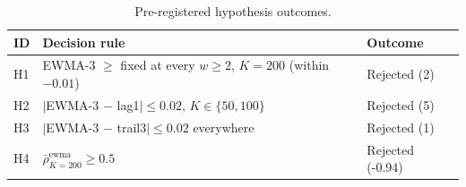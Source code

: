 \begin{table}[!t]
  \caption{Pre-registered hypothesis outcomes.}
  \label{tab:hypotheses}
  \centering
  \small
  \setlength{\tabcolsep}{4pt}
  \begin{tabular}{@{}p{0.5cm}p{5.0cm}p{1.8cm}@{}}
    \toprule
    \textbf{ID} & \textbf{Decision rule} & \textbf{Outcome} \\
    \midrule
    H1 & EWMA-3 $\geq$ fixed at every $w\geq 2$, $K=200$ (within $-0.01$) & Rejected (2) \\
    H2 & $|$EWMA-3 $-$ lag1$|\leq 0.02$, $K\in\{50,100\}$ & Rejected (5) \\
    H3 & $|$EWMA-3 $-$ trail3$|\leq 0.02$ everywhere & Rejected (1) \\
    H4 & $\bar\rho^{\mathrm{ewma}}_{K=200}\geq 0.5$ & Rejected (-0.94) \\
    \bottomrule
  \end{tabular}
\end{table}
